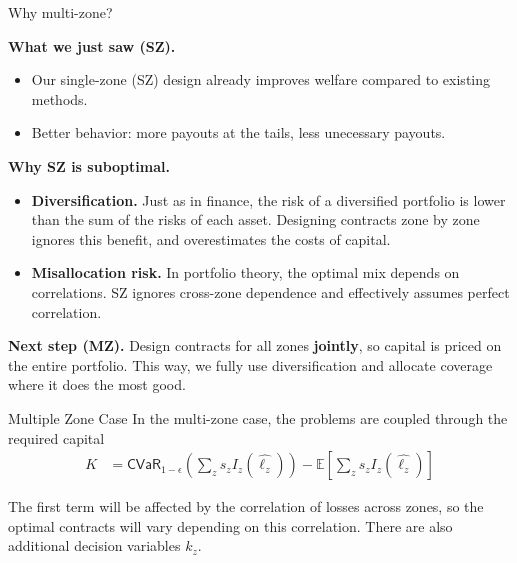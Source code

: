 \documentclass{beamer}
\begin{document}
          \begin{frame}{Why multi-zone? }
            \small
            
            \textbf{What we just saw (SZ).}
            \begin{itemize}\itemsep2pt
              \item Our single-zone (SZ) design already improves welfare compared to existing methods.
              \item Better behavior: more payouts at the tails, less unecessary payouts.
            \end{itemize}
            
            \medskip
            \textbf{Why SZ is suboptimal.}
            \begin{itemize}\itemsep2pt
              \item \textbf{Diversification.} Just as in finance, the risk of a diversified portfolio is lower than the sum of the risks of each asset.  
              Designing contracts zone by zone ignores this benefit, and overestimates the costs of capital.
              \item \textbf{Misallocation risk.} In portfolio theory, the optimal mix depends on correlations.  
              SZ ignores cross-zone dependence and effectively assumes perfect correlation. 
            \end{itemize}
            
            \medskip
            \textbf{Next step (MZ).}  
            Design contracts for all zones \textbf{jointly}, so capital is priced on the entire portfolio.  
            This way, we fully use diversification and allocate coverage where it does the most good.
            
            \end{frame}


\begin{frame}{Multiple Zone Case}
    In the multi-zone case, the problems are coupled through the required capital
    \begin{align*}
        K &= \textsf{CVaR}_{1-\epsilon} \left ( \sum_z s_z I_z(\hat{\ell_z}) \right ) - \mathbb{E}\left [\sum_z s_z I_z(\hat{\ell_z}) \right ]
    \end{align*}

    The first term will be affected by the correlation of losses across zones, so the optimal contracts will vary depending on this correlation. There are also additional decision variables $k_z$. 
    
\end{frame}
\end{document}
